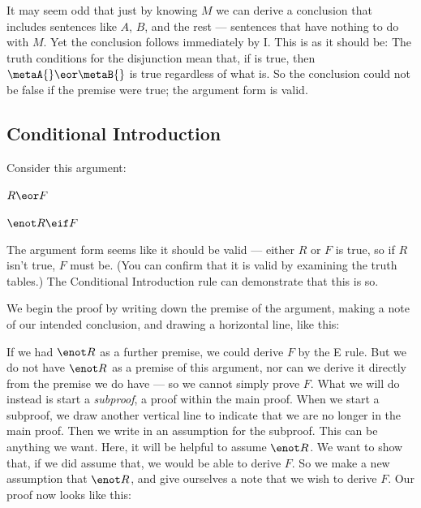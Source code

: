 \begin{ndproof}
\end{ndproof}

It may seem odd that just by knowing $M$ we can derive a conclusion that includes sentences like $A$, $B$, and the rest --- sentences that have nothing to do with $M$. Yet the conclusion follows immediately by {\eor}I. This is as it should be: The truth conditions for the disjunction mean that, if \metaA{} is true, then $\metaA{}\eor \metaB{}$ is true regardless of what \metaB{} is. So the conclusion could not be false if the premise were true; the argument form is valid.

\subsection{Conditional Introduction}

Consider this argument:
\begin{earg}
\item[] $R \eor F$
\item[\therefore] $\enot R \eif F$
\end{earg}
The argument form seems like it should be valid --- either $R$ or $F$ is true, so if $R$ isn't true, $F$ must be. (You can confirm that it is valid by examining the truth tables.) The Conditional Introduction rule can demonstrate that this is so.

We begin the proof by writing down the premise of the argument, making a note of our intended conclusion, and drawing a horizontal line, like this:

\begin{ndproof}
	 
\end{ndproof}

If we had $\enot R$ as a further premise, we could derive $F$ by the {\eor}E rule. But we do not have $\enot R$ as a premise of this argument, nor can we derive it directly from the premise we do have --- so we cannot simply prove $F$. What we will do instead is start a \emph{subproof}, a proof within the main proof. When we start a subproof, we draw another vertical line to indicate that we are no longer in the main proof. Then we write in an assumption for the subproof. This can be anything we want. Here, it will be helpful to assume $\enot R$. We want to show that, if we did assume that, we would be able to derive $F$. So we make a new assumption that $\enot R$, and give ourselves a note that we wish to derive $F$. Our proof now looks like this:

